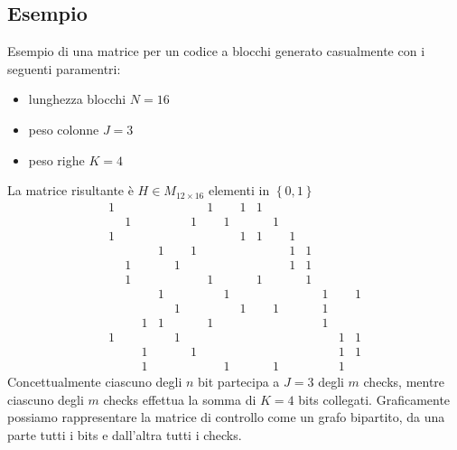 \documentclass{article}
\begin{document}
	\subsection{Esempio}
	Esempio di una matrice per un codice a blocchi generato casualmente con i seguenti paramentri:
	\begin{itemize}
		\item lunghezza blocchi $N = 16$
		\item peso colonne $J  = 3$
		\item peso righe $K = 4$
	\end {itemize}
	La matrice risultante è $H \in M_{12 \times 16}$ elementi in $\left\{0,1\right\}$
	\begin{equation*}
		\begin{smallmatrix}
			1& & & & & &1& &1&1& & & & & &  \\
			 &1& & & &1& &1& & &1& & & & &  \\
			1& & & & & & & &1&1& &1& & & &  \\
			 & & &1& &1& & & & & &1&1& & &  \\
			 &1& & &1& & & & & & &1&1& & &  \\
			 &1& & & & &1& & &1& & &1& & &  \\
			 & & &1& & & &1& & & & & &1& &1 \\
			 & & & &1& & & &1& &1& & &1& &  \\
			 & &1&1& & &1& & & & & & &1& &  \\
			1& & & &1& & & & & & & & & &1&1 \\
			 & &1& & &1& & & & & & & & &1&1 \\
			 & &1& & & & &1& & &1& & & &1& 
		\end{smallmatrix}
	\end{equation*}
	Concettualmente ciascuno degli $n$ bit partecipa a $J = 3$ degli $m$ checks, mentre ciascuno degli $m$ checks effettua la somma di $K = 4$ bits collegati.
	Graficamente possiamo rappresentare la matrice di controllo come un grafo bipartito, da una parte tutti i bits e dall'altra tutti i checks.
	
\end{document}
